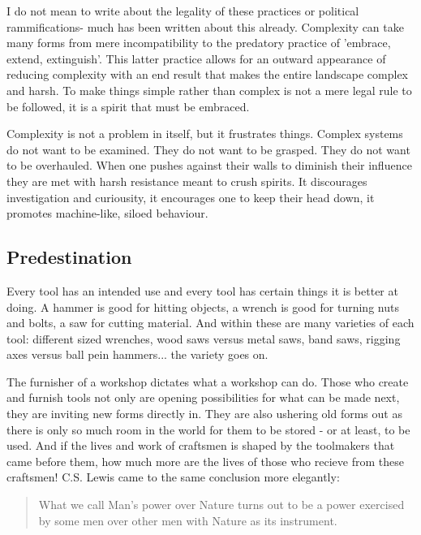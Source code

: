 \documentclass[letterpaper]{article}
\begin{document}

I do not mean to write about the legality of these practices or political rammifications- much has been written about this already. Complexity can take many forms from mere incompatibility to the predatory practice of 'embrace, extend, extinguish'. This latter practice allows for an outward appearance of reducing complexity with an end result that makes the entire landscape complex and harsh. To make things simple rather than complex is not a mere legal rule to be followed, it is a spirit that must be embraced.

Complexity is not a problem in itself, but it frustrates things. Complex systems do not want to be examined. They do not want to be grasped. They do not want to be overhauled. When one pushes against their walls to diminish their influence they are met with harsh resistance meant to crush spirits. It discourages investigation and curiousity, it encourages one to keep their head down, it promotes machine-like, siloed behaviour.
\fi

\subsection{Predestination}

Every tool has an intended use and every tool has certain things it is better at doing. A hammer is good for hitting objects, a wrench is good for turning nuts and bolts, a saw for cutting material. And within these are many varieties of each tool: different sized wrenches, wood saws versus metal saws, band saws, rigging axes versus ball pein hammers... the variety goes on.

The furnisher of a workshop dictates what a workshop can do. Those who create and furnish tools not only are opening possibilities for what can be made next, they are inviting new forms directly in. They are also ushering old forms out as there is only so much room in the world for them to be stored - or at least, to be used. And if the lives and work of craftsmen is shaped by the toolmakers that came before them, how much more are the lives of those who recieve from these craftsmen! C.S. Lewis came to the same conclusion more elegantly:

\begin{quote}
  What we call Man's power over Nature turns out to be a power exercised by some men over other men with Nature as its instrument.
\end{quote}
\end{document}
